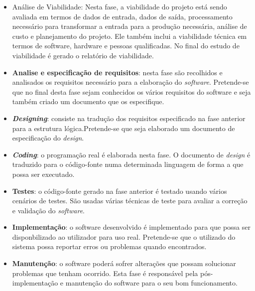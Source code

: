 \begin{itemize}
	\item Análise de Viabilidade: Nesta fase, a viabilidade do projeto está sendo avaliada em termos de dados de entrada, dados de saída, processamento necessário para transformar a entrada para a produção necessária, análise de custo e planejamento do projeto. Ele também inclui a viabilidade técnica em termos de software, hardware e pessoas qualificadas. No final do estudo de viabilidade é gerado o relatório de viabilidade.
	
	\item \textbf{Analise e especificação de requisitos}: nesta fase são recolhidos e analisados os requisitos necessário para a elaboração do \textit{software}. Pretende-se que no final desta fase sejam conhecidos os vários requisitos do software e seja também criado um documento que os especifique. 
	
	\item  \textbf{\textit{Designing}}: consiste na tradução dos requisitos especificado na fase anterior para a estrutura lógica.Pretende-se que seja elaborado um documento de especificação do \textit{design}. 
	
	
	\item  \textbf{\textit{Coding}}: o programação real é elaborada nesta fase. O documento de \textit{design} é traduzido para o código-fonte numa determinada linguagem de forma a que possa ser executado. 
	
	\item \textbf{Testes}: o código-fonte gerado na fase anterior é testado usando vários cenários de testes. São usadas várias técnicas de teste para avaliar a correção e validação do \textit{software}. 
	
	\item  \textbf{Implementação}: o software desenvolvido é implementado para que possa ser disponbilizado ao utilizador para uso real. Pretende-se que o utilizado do sistema possa reportar erros ou problemas quando encontrados. 
	
	\item  \textbf{Manutenção}: o software poderá sofrer alterações que possam solucionar problemas que tenham ocorrido. Esta fase é responsável pela pós-implementação e manutenção do software para o seu bom funcionamento.
	
\end{itemize}




%





